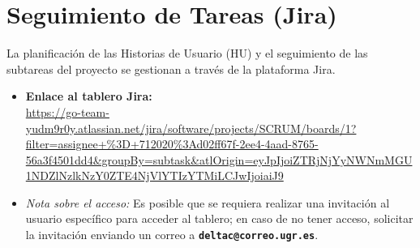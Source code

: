 \section{Seguimiento de Tareas (Jira)}
La planificación de las Historias de Usuario (HU) y el seguimiento de las subtareas del proyecto se gestionan a través de la plataforma Jira.

\begin{itemize}
    \item \textbf{Enlace al tablero Jira:} \\
    \url{https://go-team-yudm9r0y.atlassian.net/jira/software/projects/SCRUM/boards/1?filter=assignee+\%3D+712020\%3Ad02ff67f-2ee4-4aad-8765-56a3f4501dd4&groupBy=subtask&atlOrigin=eyJpIjoiZTRjNjYyNWNmMGU1NDZlNzlkNzY0ZTE4NjVlYTIzYTMiLCJwIjoiaiJ9}
    
    \item \textit{Nota sobre el acceso:} Es posible que se requiera realizar una invitación al usuario específico para acceder al tablero; en caso de no tener acceso, solicitar la invitación enviando un correo a \textbf{\texttt{deltac@correo.ugr.es}}.
\end{itemize}